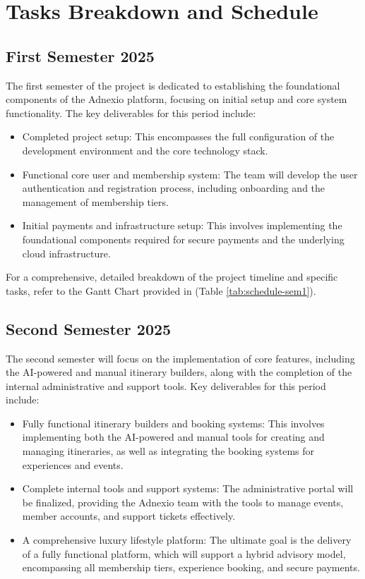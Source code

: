 \section{Tasks Breakdown and Schedule}
\subsection{First Semester 2025}
The first semester of the project is dedicated to establishing the foundational components of the Adnexio platform, focusing on initial setup and core system functionality. The key deliverables for this period include:
\begin{itemize}
    \item Completed project setup: This encompasses the full configuration of the development environment and the core technology stack.
    \item Functional core user and membership system: The team will develop the user authentication and registration process, including onboarding and the management of membership tiers.
    \item Initial payments and infrastructure setup: This involves implementing the foundational components required for secure payments and the underlying cloud infrastructure.
\end{itemize}

For a comprehensive, detailed breakdown of the project timeline and specific tasks, refer to the Gantt Chart provided in (Table \ref{tab:schedule-sem1}).

\vspace{1em}


\subsection{Second Semester 2025}
The second semester will focus on the implementation of core features, including the AI-powered and manual itinerary builders, along with the completion of the internal administrative and support tools. Key deliverables for this period include:
\begin{itemize}
    \item Fully functional itinerary builders and booking systems: This involves implementing both the AI-powered and manual tools for creating and managing itineraries, as well as integrating the booking systems for experiences and events.
    \item Complete internal tools and support systems: The administrative portal will be finalized, providing the Adnexio team with the tools to manage events, member accounts, and support tickets effectively.
    \item A comprehensive luxury lifestyle platform: The ultimate goal is the delivery of a fully functional platform, which will support a hybrid advisory model, encompassing all membership tiers, experience booking, and secure payments.
\end{itemize}

